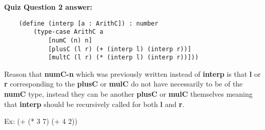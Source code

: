 \documentclass{article}
\begin{document}
\textbf{Quiz Question 2 answer:}

\begin{verbatim}
    (define (interp [a : ArithC]) : number
        (type-case ArithC a
            [numC (n) n]
            [plusC (l r) (+ (interp l) (interp r))]
            [multC (l r) (* (interp l) (interp r))]))

\end{verbatim}
Reason that \textbf{numC-n} which was previously written instead of \textbf{interp} is that \textbf{l} or
\textbf{r} corresponding to the \textbf{plusC} or \textbf{mulC} do not have necessarily to be of the \textbf{numC}
type, instead they can be another \textbf{plusC} or  \textbf{mulC} themselves meaning that \textbf{interp} should
be recursively called for both \textbf{l} and \textbf{r}.

Ex: (+ (* 3 7) (+ 4 2))
\end{document}

